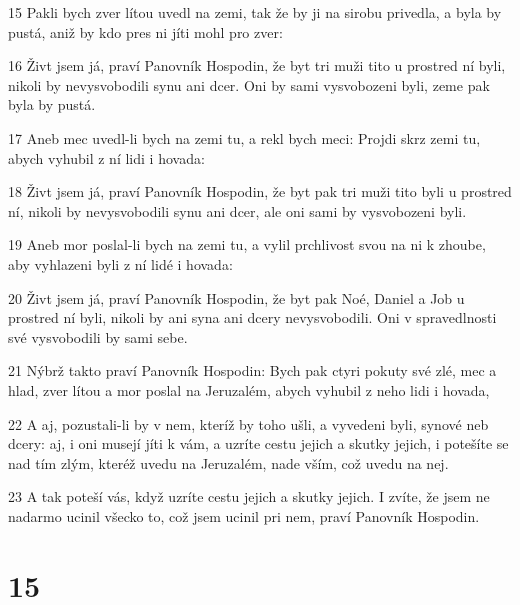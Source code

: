 \par 15 Pakli bych zver lítou uvedl na zemi, tak že by ji na sirobu privedla, a byla by pustá, aniž by kdo pres ni jíti mohl pro zver:
\par 16 Živt jsem já, praví Panovník Hospodin, že byt tri muži tito u prostred ní byli, nikoli by nevysvobodili synu ani dcer. Oni by sami vysvobozeni byli, zeme pak byla by pustá.
\par 17 Aneb mec uvedl-li bych na zemi tu, a rekl bych meci: Projdi skrz zemi tu, abych vyhubil z ní lidi i hovada:
\par 18 Živt jsem já, praví Panovník Hospodin, že byt pak tri muži tito byli u prostred ní, nikoli by nevysvobodili synu ani dcer, ale oni sami by vysvobozeni byli.
\par 19 Aneb mor poslal-li bych na zemi tu, a vylil prchlivost svou na ni k zhoube, aby vyhlazeni byli z ní lidé i hovada:
\par 20 Živt jsem já, praví Panovník Hospodin, že byt pak Noé, Daniel a Job u prostred ní byli, nikoli by ani syna ani dcery nevysvobodili. Oni v spravedlnosti své vysvobodili by sami sebe.
\par 21 Nýbrž takto praví Panovník Hospodin: Bych pak ctyri pokuty své zlé, mec a hlad, zver lítou a mor poslal na Jeruzalém, abych vyhubil z neho lidi i hovada,
\par 22 A aj, pozustali-li by v nem, kteríž by toho ušli, a vyvedeni byli, synové neb dcery: aj, i oni musejí jíti k vám, a uzríte cestu jejich a skutky jejich, i potešíte se nad tím zlým, kteréž uvedu na Jeruzalém, nade vším, což uvedu na nej.
\par 23 A tak poteší vás, když uzríte cestu jejich a skutky jejich. I zvíte, že jsem ne nadarmo ucinil všecko to, což jsem ucinil pri nem, praví Panovník Hospodin.

\chapter{15}

